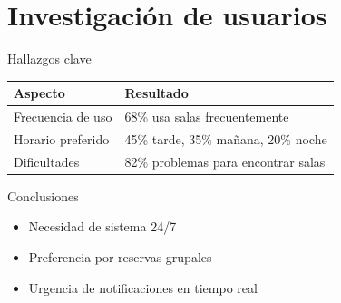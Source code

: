 \documentclass[10pt]{beamer}
\begin{document}
\section{Investigación de usuarios}
\begin{frame}{Hallazgos clave}
\begin{table}[ht]
\centering
\small
\begin{tabular}{p{} p{}}
\toprule
\textbf{Aspecto} & \textbf{Resultado} \\
\midrule
Frecuencia de uso & 68\% usa salas frecuentemente \\
Horario preferido & 45\% tarde, 35\% mañana, 20\% noche \\
Dificultades & 82\% problemas para encontrar salas \\
\bottomrule
\end{tabular}
\end{table}

\begin{block}{Conclusiones}
\begin{itemize}
\item Necesidad de sistema 24/7
\item Preferencia por reservas grupales
\item Urgencia de notificaciones en tiempo real
\end{itemize}
\end{block}
\end{frame}
\end{document}
